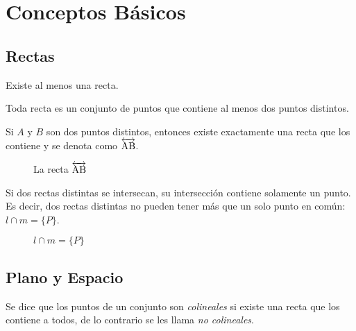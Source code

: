 \clearpage
\section{Conceptos Básicos}

\subsection{Rectas}

\begin{postulate}
    Existe al menos una recta.
\end{postulate}

\begin{postulate}
    Toda recta es un conjunto de puntos que contiene al menos dos puntos distintos.
\end{postulate}

\begin{postulate}
    Si $A$ y $B$ son dos puntos distintos, entonces existe exactamente una recta que los contiene y se denota como $\overleftrightarrow{\rm AB}$.
    
    \begin{figure}[h]
        \centering
        
        \caption{La recta $\overleftrightarrow{\rm AB}$}
        \label{fig:plot3}
    \end{figure}
\end{postulate}

\begin{theorem}

Si dos rectas distintas se intersecan, su intersección contiene solamente un punto. Es decir, dos rectas distintas no pueden tener más que un solo punto en común: $l \cap m = \{P\}$.

    \begin{figure}[!h]
        \centering
        
        \caption{$l \cap m = \{P\}$}
        \label{fig:plot19}
    \end{figure}
    
\end{theorem}

\subsection{Plano y Espacio}

\begin{definition}
    Se dice que los puntos de un conjunto son \textit{colineales} si existe una recta que los contiene a todos, de lo contrario se les llama \textit{no colineales}.
\end{definition}


